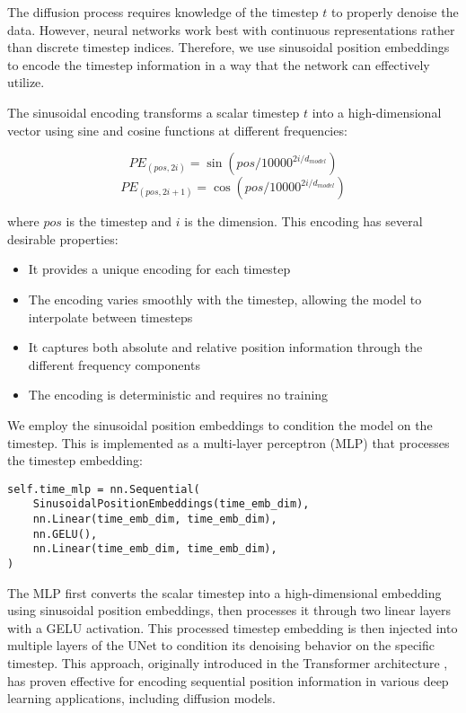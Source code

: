 The diffusion process requires knowledge of the timestep $t$ to properly denoise the data. However, neural networks work best with continuous representations rather than discrete timestep indices. Therefore, we use sinusoidal position embeddings to encode the timestep information in a way that the network can effectively utilize.

The sinusoidal encoding transforms a scalar timestep $t$ into a high-dimensional vector using sine and cosine functions at different frequencies:

\begin{equation}
    PE_{(pos,2i)} = \sin(pos/10000^{2i/d_{model}})
\end{equation}
\begin{equation}
    PE_{(pos,2i+1)} = \cos(pos/10000^{2i/d_{model}})
\end{equation}

\noindent where $pos$ is the timestep and $i$ is the dimension. This encoding has several desirable properties:

\begin{itemize}
    \item It provides a unique encoding for each timestep
    \item The encoding varies smoothly with the timestep, allowing the model to interpolate between timesteps
    \item It captures both absolute and relative position information through the different frequency components
    \item The encoding is deterministic and requires no training
\end{itemize}


\noindent We employ the sinusoidal position embeddings to condition the model on the timestep. This is implemented as a multi-layer perceptron (MLP) that processes the timestep embedding:

\begin{lstlisting}[basicstyle=\tiny]
self.time_mlp = nn.Sequential(
    SinusoidalPositionEmbeddings(time_emb_dim),
    nn.Linear(time_emb_dim, time_emb_dim),
    nn.GELU(),
    nn.Linear(time_emb_dim, time_emb_dim),
)
\end{lstlisting}

\noindent The MLP first converts the scalar timestep into a high-dimensional embedding using sinusoidal position embeddings, then processes it through two linear layers with a GELU activation. This processed timestep embedding is then injected into multiple layers of the UNet to condition its denoising behavior on the specific timestep. This approach, originally introduced in the Transformer architecture \cite{vaswani2017attention}, has proven effective for encoding sequential position information in various deep learning applications, including diffusion models.


